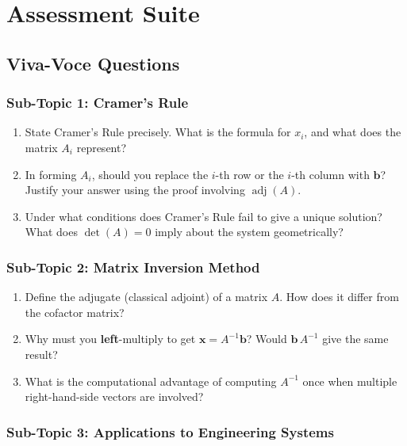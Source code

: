 \documentclass[12pt,a4paper]{article}
\begin{document}
\section{Assessment Suite}

\subsection*{Viva-Voce Questions}

\subsubsection*{Sub-Topic 1: Cramer's Rule}

\begin{enumerate}[noitemsep, label=\textbf{V\arabic*.}]
  \item State Cramer's Rule precisely. What is the formula for $x_i$, and what does the matrix $A_i$ represent?
  \item In forming $A_i$, should you replace the $i$-th row or the $i$-th column with $\mathbf{b}$? Justify your answer using the proof involving $\operatorname{adj}(A)$.
  \item Under what conditions does Cramer's Rule fail to give a unique solution? What does $\det(A)=0$ imply about the system geometrically?
\end{enumerate}

\subsubsection*{Sub-Topic 2: Matrix Inversion Method}

\begin{enumerate}[noitemsep, label=\textbf{V\arabic*.}, start=4]
  \item Define the adjugate (classical adjoint) of a matrix $A$. How does it differ from the cofactor matrix?
  \item Why must you \textbf{left}-multiply to get $\mathbf{x} = A^{-1}\mathbf{b}$? Would $\mathbf{b}\,A^{-1}$ give the same result?
  \item What is the computational advantage of computing $A^{-1}$ once when multiple right-hand-side vectors are involved?
\end{enumerate}

\subsubsection*{Sub-Topic 3: Applications to Engineering Systems}
\end{document}
